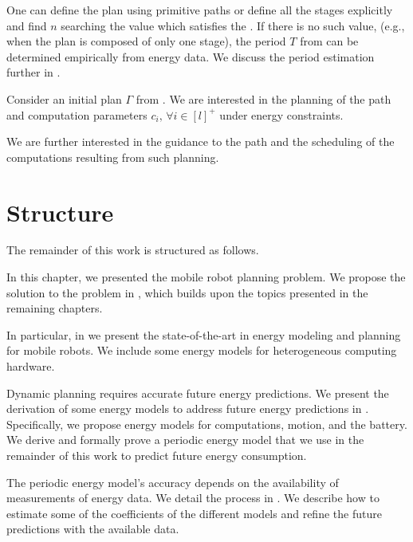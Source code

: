 One can define the plan using primitive paths or define all the stages explicitly and find $n$ searching the value which satisfies the . If there is no such value, (e.g., when the plan is composed of only one stage), the period $T$ from  can be determined empirically from energy data. We discuss the period estimation further in .

\begin{highlight}
\begin{pb}\label{pb}
  Consider an initial plan $\Gamma$ from . We are interested in the planning of the path and computation parameters $c_i,\,\forall i\in[l]^+$ under energy constraints.
  
We are further interested in the guidance to the path and the scheduling of the computations resulting from such planning.
\end{pb}    
\end{highlight}

\section{Structure}
\label{sec:structure}

The remainder of this work is structured as follows.

In this chapter, we presented the mobile robot planning problem. We propose the solution to the problem in , which builds upon the topics presented in the remaining chapters.

In particular, in  we present the state-of-the-art in energy modeling and planning for mobile robots. We include some energy models for heterogeneous computing hardware.

Dynamic planning requires accurate future energy predictions. We present the derivation of some energy models to address future energy predictions in . Specifically, we propose energy models for computations, motion, and the battery. We derive and formally prove a periodic energy model that we use in the remainder of this work to predict future energy consumption.

The periodic energy model's accuracy depends on the availability of measurements of energy data. We detail the process in . We describe how to estimate some of the coefficients of the different models and refine the future predictions with the available data.

